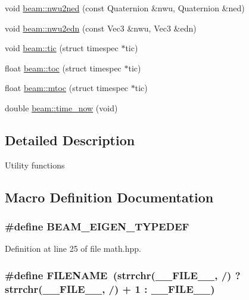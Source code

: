 \begin{DoxyCompactItemize}
void \hyperlink{group__utils_ga7f2d193025c27530e4736c9fabba6aeb}{beam\+::nwu2ned} (const Quaternion \&nwu, Quaternion \&ned)
\item 
void \hyperlink{group__utils_gacd46e4e0d954431486c743882f04b1a3}{beam\+::nwu2edn} (const Vec3 \&nwu, Vec3 \&edn)
\item 
void \hyperlink{group__utils_gaaebadeacafd2b1816dab04b0db7147f6}{beam\+::tic} (struct timespec $\ast$tic)
\item 
float \hyperlink{group__utils_gabe4bc58525b5b33ead190307009c9335}{beam\+::toc} (struct timespec $\ast$tic)
\item 
float \hyperlink{group__utils_gab928984bd87de1db648f2b349fdeac74}{beam\+::mtoc} (struct timespec $\ast$tic)
\item 
double \hyperlink{group__utils_gab7f144a34f327358efbe5c08af63fdb7}{beam\+::time\+\_\+now} (void)
\end{DoxyCompactItemize}


\subsection{Detailed Description}
Utility functions 

\subsection{Macro Definition Documentation}
\subsubsection[{\texorpdfstring{B\+E\+A\+M\+\_\+\+E\+I\+G\+E\+N\+\_\+\+T\+Y\+P\+E\+D\+EF}{BEAM_EIGEN_TYPEDEF}}]{\setlength{\rightskip}{0pt plus 5cm}\#define B\+E\+A\+M\+\_\+\+E\+I\+G\+E\+N\+\_\+\+T\+Y\+P\+E\+D\+EF}\hypertarget{group__utils_ga9f2375aee996fb13eecdf9eab8aceb6e}{}\label{group__utils_ga9f2375aee996fb13eecdf9eab8aceb6e}


Definition at line 25 of file math.\+hpp.

\subsubsection[{\texorpdfstring{F\+I\+L\+E\+N\+A\+ME}{FILENAME}}]{\setlength{\rightskip}{0pt plus 5cm}\#define F\+I\+L\+E\+N\+A\+ME~(strrchr(\+\_\+\+\_\+\+F\+I\+L\+E\+\_\+\+\_\+, \textquotesingle{}/\textquotesingle{}) ? strrchr(\+\_\+\+\_\+\+F\+I\+L\+E\+\_\+\+\_\+, \textquotesingle{}/\textquotesingle{}) + 1 \+: \+\_\+\+\_\+\+F\+I\+L\+E\+\_\+\+\_\+)}\hypertarget{group__utils_ga8de29f7c8bbf1a81cc6e71ac602032d3}{}\label{group__utils_ga8de29f7c8bbf1a81cc6e71ac602032d3}


